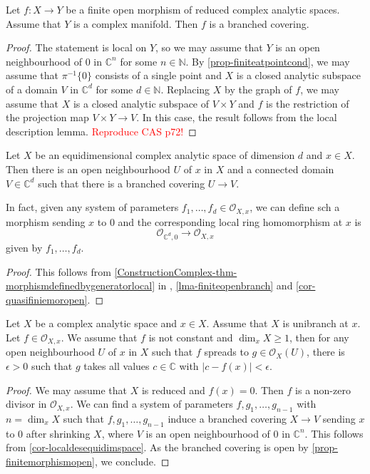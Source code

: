 \begin{lemma}\label{lma-finiteopenbranch}
    Let $f:X\rightarrow Y$ be a finite open morphism of reduced complex analytic spaces. Assume that $Y$ is a complex manifold. Then $f$ is a branched covering.
\end{lemma}
\begin{proof}
    The statement is local on $Y$, so we may assume that $Y$ is an open neighbourhood of $0$ in $\mathbb{C}^n$ for some $n\in \mathbb{N}$. By \cref{prop-finiteatpointcond}, we may assume that $\pi^{-1}\{0\}$ consists of a single point and $X$ is a closed analytic subspace of a domain $V$ in $\mathbb{C}^d$ for some $d\in \mathbb{N}$. Replacing $X$ by the graph of $f$, we may assume that $X$ is a closed analytic subspace of $V\times Y$ and $f$ is the restriction of the projection map $V\times Y\rightarrow V$.  In this case, the result follows from the local description lemma. \textcolor{red}{Reproduce CAS p72!} 
\end{proof}
\begin{corollary}\label{cor-localdesequidimspace}
    Let $X$ be an equidimensional complex analytic space of dimension $d$ and $x\in X$. Then there is an open neighbourhood $U$ of $x$ in $X$ and a connected domain $V\in \mathbb{C}^d$  such that there is a branched covering $U\rightarrow V$.

    In fact, given any system of parameters $f_1,\ldots,f_d\in \mathcal{O}_{X,x}$, we can define sch a morphism sending $x$ to $0$ and the corresponding local ring homomorphism at $x$ is 
    \[
        \mathcal{O}_{\mathbb{C}^d,0}\rightarrow \mathcal{O}_{X,x}  
    \]
    given by $f_1,\ldots,f_d$.
\end{corollary}
\begin{proof}
    This follows from \cref{ConstructionComplex-thm-morphismdefinedbygeneratorlocal} in , \cref{lma-finiteopenbranch} and \cref{cor-quasifiniemoropen}.
\end{proof}


\begin{corollary}\label{cor-takeallvalues}
    Let $X$ be a complex analytic space and $x\in X$. Assume that $X$ is unibranch at $x$. Let $f\in \mathcal{O}_{X,x}$. We assume that $f$ is not constant and $\dim_x X\geq 1$, then for any open neighbourhood $U$ of $x$ in $X$ such that $f$ spreads to $g\in \mathcal{O}_X(U)$, there is $\epsilon>0$ such that $g$ takes all values $c\in \mathbb{C}$ with $|c-f(x)|<\epsilon$.
\end{corollary}
\begin{proof}
    We may assume that $X$ is reduced and $f(x)=0$. Then $f$ is a non-zero divisor in $\mathcal{O}_{X,x}$. We can find a system of parameters $f,g_1,\ldots,g_{n-1}$ with $n=\dim_x X$ such that $f,g_1,\ldots,g_{n-1}$ induce a branched covering $X\rightarrow V$ sending $x$ to $0$ after shrinking $X$, where $V$ is an open neighbourhood of $0$ in $\mathbb{C}^n$. This follows from \cref{cor-localdesequidimspace}. As the branched covering is open by \cref{prop-finitemorphismopen}, we conclude.
\end{proof}

